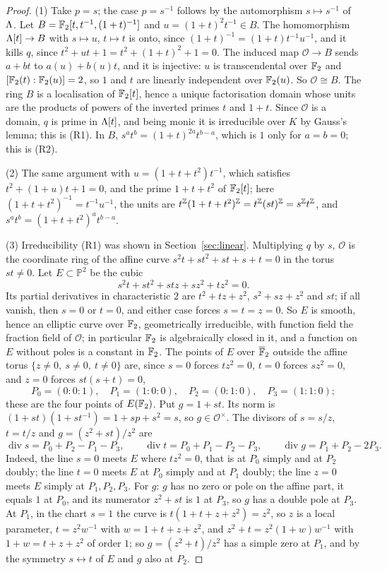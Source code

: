 \begin{proof}
(1) Take $p=s$; the case $p=s^{-1}$ follows by the automorphism $s\mapsto s^{-1}$ of $\Lambda$. Let $B=\mathbb{F}_2[t,t^{-1},(1+t)^{-1}]$ and $u=(1+t)^2t^{-1}\in B$. The homomorphism $\Lambda[t]\to B$ with $s\mapsto u$, $t\mapsto t$ is onto, since $(1+t)^{-1}=(1+t)t^{-1}u^{-1}$, and it kills $q$, since $t^2+ut+1=t^2+(1+t)^2+1=0$. The induced map $\mathcal O\to B$ sends $a+bt$ to $a(u)+b(u)t$, and it is injective: $u$ is transcendental over $\mathbb{F}_2$ and $[\mathbb{F}_2(t):\mathbb{F}_2(u)]=2$, so $1$ and $t$ are linearly independent over $\mathbb{F}_2(u)$. So $\mathcal O\cong B$. The ring $B$ is a localisation of $\mathbb{F}_2[t]$, hence a unique factorisation domain whose units are the products of powers of the inverted primes $t$ and $1+t$. Since $\mathcal O$ is a domain, $q$ is prime in $\Lambda[t]$, and being monic it is irreducible over $K$ by Gauss's lemma; this is (R1). In $B$, $s^at^b=(1+t)^{2a}t^{b-a}$, which is $1$ only for $a=b=0$; this is (R2).

(2) The same argument with $u=(1+t+t^2)t^{-1}$, which satisfies $t^2+(1+u)t+1=0$, and the prime $1+t+t^2$ of $\mathbb{F}_2[t]$; here $(1+t+t^2)^{-1}=t^{-1}u^{-1}$, the units are $t^{\mathbb{Z}}(1+t+t^2)^{\mathbb{Z}}=t^{\mathbb{Z}}(st)^{\mathbb{Z}}=s^{\mathbb{Z}}t^{\mathbb{Z}}$, and $s^at^b=(1+t+t^2)^at^{b-a}$.

(3) Irreducibility (R1) was shown in Section~\ref{sec:linear}. Multiplying $q$ by $s$, $\mathcal O$ is the coordinate ring of the affine curve $s^2t+st^2+st+s+t=0$ in the torus $st\ne0$. Let $E\subset\mathbb P^2$ be the cubic
\[
s^2t+st^2+stz+sz^2+tz^2=0 .
\]
Its partial derivatives in characteristic $2$ are $t^2+tz+z^2$, $s^2+sz+z^2$ and $st$; if all vanish, then $s=0$ or $t=0$, and either case forces $s=t=z=0$. So $E$ is smooth, hence an elliptic curve over $\mathbb{F}_2$, geometrically irreducible, with function field the fraction field of $\mathcal O$; in particular $\mathbb{F}_2$ is algebraically closed in it, and a function on $E$ without poles is a constant in $\mathbb{F}_2$. The points of $E$ over $\overline{\mathbb{F}}_2$ outside the affine torus $\{z\ne0,\ s\ne0,\ t\ne0\}$ are, since $s=0$ forces $tz^2=0$, $t=0$ forces $sz^2=0$, and $z=0$ forces $st(s+t)=0$,
\[
P_0=(0:0:1),\quad P_1=(1:0:0),\quad P_2=(0:1:0),\quad P_3=(1:1:0);
\]
these are the four points of $E(\mathbb{F}_2)$. Put $g=1+st$. Its norm is $(1+st)(1+st^{-1})=1+sp+s^2=s$, so $g\in\mathcal O^{\times}$. The divisors of $s=s/z$, $t=t/z$ and $g=(z^2+st)/z^2$ are
\[
\operatorname{div}s=P_0+P_2-P_1-P_3,\qquad \operatorname{div}t=P_0+P_1-P_2-P_3,\qquad \operatorname{div}g=P_1+P_2-2P_3 .
\]
Indeed, the line $s=0$ meets $E$ where $tz^2=0$, that is at $P_0$ simply and at $P_2$ doubly; the line $t=0$ meets $E$ at $P_0$ simply and at $P_1$ doubly; the line $z=0$ meets $E$ simply at $P_1,P_2,P_3$. For $g$: $g$ has no zero or pole on the affine part, it equals $1$ at $P_0$, and its numerator $z^2+st$ is $1$ at $P_3$, so $g$ has a double pole at $P_3$. At $P_1$, in the chart $s=1$ the curve is $t(1+t+z+z^2)=z^2$, so $z$ is a local parameter, $t=z^2w^{-1}$ with $w=1+t+z+z^2$, and $z^2+t=z^2(1+w)w^{-1}$ with $1+w=t+z+z^2$ of order $1$; so $g=(z^2+t)/z^2$ has a simple zero at $P_1$, and by the symmetry $s\leftrightarrow t$ of $E$ and $g$ also at $P_2$.


\end{proof}
